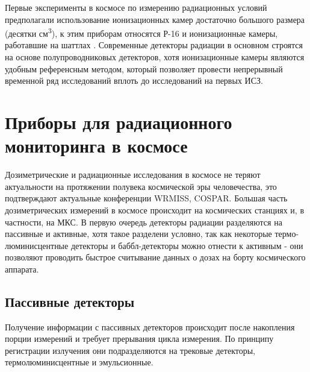 Первые эксперименты в космосе по измерению радиационных условий предполагали использование ионизационных камер достаточно большого размера (десятки см\textsuperscript{3}), к этим приборам относятся Р-16 \cite{Mitricas2002} и ионизационные камеры, работавшие на шаттлах \cite{Dorman2004}. Современные детекторы радиации в основном строятся на основе полупроводниковых детекторов, хотя ионизационные камеры являются удобным референсным методом, который позволяет провести непрерывный временной ряд исследований вплоть до исследований на первых ИСЗ.


\section{Приборы для радиационного мониторинга в космосе} \label{sect1_3}

Дозиметрические и радиационные исследования в космосе не теряют актуальности на протяжении полувека космической эры человечества, это подтверждают актуальные  конференции WRMISS, COSPAR. Большая часть дозиметрических измерений в космосе происходит на космических станциях и, в частности, на МКС. 
В первую очередь детекторы радиации разделяются на пассивные и активные, хотя такое разделени условно, так как некоторые термо-люминисцентные детекторы и баббл-детекторы можно отнести к активным - они позволяют проводить быстрое считывание данных о дозах на борту космического аппарата. 

\subsection{Пассивные детекторы} \label{subsect1_3_1}

Получение информации с пассивных детекторов происходит после накопления порции измерений и требует прерывания цикла измерения. По принципу регистрации излучения они подразделяются на трековые детекторы, термолюминисцентные \cite{Luszik-Bhadra1999,Kulkarni2011} и эмульсионные. 

